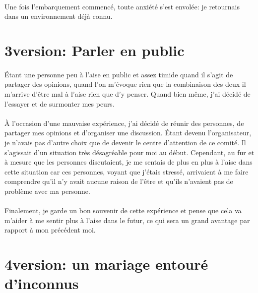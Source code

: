 \paragraph{} Une fois l'embarquement commencé, toute anxiété s'est envolée: je
retournais dans un environnement déjà connu.

\section{3\ieme version: Parler en public}

\paragraph{} Étant une personne peu à l'aise en public et assez timide quand il
s'agit de partager des opinions, quand l'on m'évoque rien que la combinaison
des deux il m'arrive d'être mal à l'aise rien que d'y penser. Quand bien même,
j'ai décidé de l'essayer et de surmonter mes peurs.

\paragraph{} À l'occasion d'une mauvaise expérience, j'ai décidé de réunir des
personnes, de partager mes opinions et d'organiser une discussion. Étant devenu
l'organisateur, je n'avais pas d'autre choix que de devenir le centre
d'attention de ce comité. Il s'agissait d'un situation très désagréable pour
moi au début. Cependant, au fur et à mesure que les personnes discutaient, je
me sentais de plus en plus à l'aise dans cette situation car ces personnes,
voyant que j'étais stressé, arrivaient à me faire comprendre qu'il n'y avait
aucune raison de l'être et qu'ils n'avaient pas de problème avec ma personne.

\paragraph{} Finalement, je garde un bon souvenir de cette expérience et pense
que cela va m'aider à me sentir plus à l'aise dans le futur, ce qui sera un
grand avantage par rapport à mon précédent moi.

\section[4\ieme version: le mariage]{4\ieme version: un mariage entouré d'inconnus}

